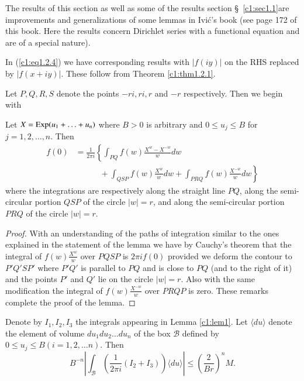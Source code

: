 \begin{remark}\label{c1:rem4}
The results of this section as well as some of the results section \S\ \ref{c1:sec1.1}\pageoriginale are improvements and generalizations of some lemmas in Ivi\'c's book (see page 172 of this book. Here the results concern Dirichlet series with a functional equation and are of a special nature).
\end{remark}

\begin{remark}\label{c1:rem5}
In (\ref{c1:eq1.2.4}) we have corresponding results with $|f(iy)|$ on the RHS replaced by $|f(x + iy)|$. These follow from Theorem \ref{c1:thm1.2.1}.
\end{remark}

\medskip
{} Let $P,Q,R,S$ denote the points $-ri, ri, r$ and $-r$ respectively. Then we begin with

\setcounter{lem}{0}
\begin{lem}\label{c1:lem1}
Let $X = \operatorname{Exp} (u_1 + \ldots + u_n)$ where $B > 0$ is arbitrary and $0 \leq u_j \leq B$ for $j = 1,2, \ldots , n$. Then
\begin{align*}
f(0) &= \frac{1}{2\pi i} \left\{ \int_{PQ} f(w) \frac{X^w - X^{-w}}{w}
dw\right.\\ 
&\left.\qquad\quad + \int_{QSP} f(w) \frac{X^w}{w} dw + \int_{PRQ} f(w) \frac{X^{-w}}{w} dw \right\} 
\tag{1.2.7}\label{c1:eq1.2.7}
\end{align*}
where the integrations are respectively along the straight line $PQ$, along the semi-circular portion $QSP$ of the circle $|w| =r$, and along the semi-circular portion $PRQ$ of the circle $|w| =r$.
\end{lem}

\begin{proof}
With an understanding of the paths of integration similar to the ones explained in the statement of the lemma we have by Cauchy's theorem that the integral of $f(w) \frac{X^w}{w}$ over $PQSP$ is $2\pi i f(0)$ provided we deform the contour to $P'Q'SP'$ where $P'Q'$ is parallel to $PQ$ and is close to $PQ$ (and to the right of it) and the points $P'$ and $Q'$ lie on the circle $|w| =r$. Also with the same modification the integral of $f(w) \frac{X^{-w}}{w}$ over $PRQP$ is zero. These remarks complete the proof of the lemma.
\end{proof}

\begin{lem}\label{c1:lem2}
Denote by $I_1, I_2, I_3$ the integrals appearing in Lemma \ref{c1:lem1}. Let $\langle du \rangle$ denote the element of volume $du_1 du_2 \ldots du_n$ of the box $\mathcal{B}$ defined by $0 \leq u_j \leq B (i = 1, 2, \ldots n)$. Then
\begin{equation*}
B^{-n} \left| \int_\mathcal{B} \left( \frac{1}{2 \pi i} (I_2 + I_3)\right) \langle du \rangle \right| \leq \left(\frac{2}{Br} \right)^n  M. \tag{1.2.8}\label{c1:eq1.2.8}
\end{equation*}
\end{lem}

